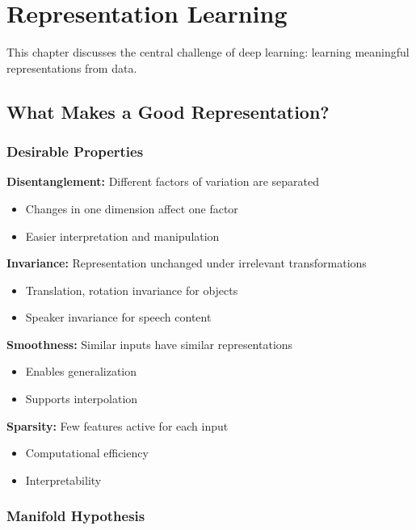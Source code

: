 
\chapter{Representation Learning}
\label{chap:representation-learning}

This chapter discusses the central challenge of deep learning: learning meaningful representations from data.

\section{What Makes a Good Representation?}
\label{sec:good-representations}

\subsection{Desirable Properties}

\textbf{Disentanglement:} Different factors of variation are separated
\begin{itemize}
    \item Changes in one dimension affect one factor
    \item Easier interpretation and manipulation
\end{itemize}

\textbf{Invariance:} Representation unchanged under irrelevant transformations
\begin{itemize}
    \item Translation, rotation invariance for objects
    \item Speaker invariance for speech content
\end{itemize}

\textbf{Smoothness:} Similar inputs have similar representations
\begin{itemize}
    \item Enables generalization
    \item Supports interpolation
\end{itemize}

\textbf{Sparsity:} Few features active for each input
\begin{itemize}
    \item Computational efficiency
    \item Interpretability
\end{itemize}

\subsection{Manifold Hypothesis}

